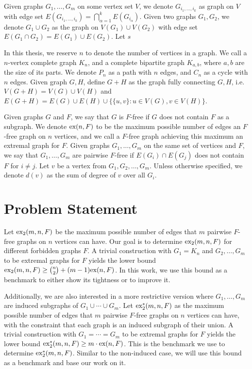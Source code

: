 \documentclass[10pt, reqno]{report}
\newcommand*{\ex}{\textnormal{ex}}
\newcommand*{\dex}{\textnormal{ex}_2}
\begin{document}
Given graphs $G_1, \ldots, G_m$ on some vertex set $V$, we denote $G_{i_1, \ldots, i_k}$ as graph on $V$ with edge set $E(G_{i_1, \ldots, i_k}) = \bigcap_{\alpha = 1}^k E(G_{i_\alpha})$. Given two graphs $G_1, G_2$, we denote $G_1 \cup G_2$ as the graph on $V(G_1) \cup V(G_2)$ with edge set $E(G_1 \cap G_2) = E(G_1) \cup E(G_2)$. Let $s$

In this thesis, we reserve $n$ to denote the number of vertices in a graph. We call a $n$-vertex complete graph $K_n$, and a complete bipartite graph $K_{a, b}$, where $a, b$ are the size of its parts. We denote $P_n$ as a path with $n$ edges, and $C_n$ as a cycle with $n$ edges. Given graph $G, H$, define $G + H$ as the graph fully connecting $G, H$, i.e. $V(G + H) = V(G) \cup V(H)$ and $E(G + H) = E(G) \cup E(H) \cup \{\{u, v\} : u \in V(G), v \in V(H)\}$.

Given graphs $G$ and $F$, we say that $G$ is $F$-free if $G$ does not contain $F$ as a subgraph. We denote $\ex(n, F)$ to be the maximum  possible number of edges an $F$-free graph on $n$ vertices, and we call a $F$-free graph achieving this maximum an extremal graph for $F$. Given graphs $G_1, \ldots, G_m$ on the same set of vertices and $F$, we say that $G_1, \ldots, G_m$ are pairwise $F$-free if $E(G_i) \cap E(G_j)$ does not contain $F$ for $i \neq j$. Let $v$ be a vertex from $G_1, G_2, \ldots, G_m$. Unless otherwise specified, we denote $d(v)$ as the sum of degree of $v$ over all $G_i$.

\section{Problem Statement}

Let $\dex(m, n, F)$ be the maximum possible number of edges that $m$ pairwise $F$-free graphs on $n$ vertices can have. Our goal is to determine $\dex(m, n, F)$ for different forbidden graphs $F$. A trivial construction with $G_1 = K_n$ and $G_2, \ldots, G_m$ to be extremal graphs for $F$ yields the lower bound $\dex(m, n, F) \geq \binom{n}{2} + (m - 1)\ex(n, F)$. In this work, we use this bound as a benchmark to either show its tightness or to improve it.

Additionally, we are also interested in a more restrictive version where $G_1, \ldots, G_m$ are induced subgraphs of $G_1 \cup \cdots \cup G_m$. Let $\dex^*(m, n, F)$ as the maximum possible number of edges that $m$ pairwise $F$-free graphs on $n$ vertices can have, with the constraint that each graph is an induced subgraph of their union. A trivial construction with $G_1 = \cdots = G_m$ to be extremal graphs for $F$ yields the lower bound $\dex^*(m, n, F) \geq m \cdot \ex(n, F)$. This is the benchmark we use to determine $\dex^*(m, n, F)$. Similar to the non-induced case, we will use this bound as a benchmark and base our work on it.
\end{document}
